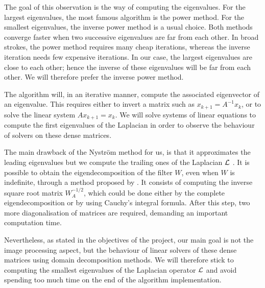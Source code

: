 The goal of this observation is the way of computing the eigenvalues.
For the largest eigenvalues, the most famous algorithm is the power method.
For the smallest eigenvalues, the inverse power method is a usual choice.
Both methods converge faster when two successive eigenvalues are far from each other.
In broad strokes, the power method requires many cheap iterations, whereas the inverse iteration needs few expensive iterations.
In our case, the largest eigenvalues are close to each other; hence the inverse of these eigenvalues will be far from each other.
We will therefore prefer the inverse power method.

The algorithm will, in an iterative manner, compute the associated eigenvector of an eigenvalue.
This requires either to invert a matrix such as \(x_{k+1} = A^{-1} x_k\), or to solve the linear system \(A x_{k+1} = x_k\).
We will solve systems of linear equations to compute the first eigenvalues of the Laplacian in order to observe the behaviour of solvers on these dense matrices.

The main drawback of the Nystr\"om method for us, is that it approximates the leading eigenvalues but we compute the trailing ones of the Laplacian \(\operatorname{\mathcal{L}}\) \cite{belongie_spectral_2002}.
It is possible to obtain the eigendecomposition of the filter \(W\), even when \(W\) is indefinite, through a method proposed by \cite{fowlkes_spectral_2004}.
It consists of computing the inverse square root matrix \(W_A^{-1/2}\), which could be done either by the complete eigendecomposition or by using Cauchy's integral formula.
After this step, two more diagonalisation of matrices are required, demanding an important computation time.

Nevertheless, as stated in the objectives of the project, our main goal is not the image processing aspect, but the behaviour of linear solvers of these dense matrices using domain decomposition methods.
We will therefore stick to computing the smallest eigenvalues of the Laplacian operator \(\operatorname{\mathcal{L}}\) and avoid spending too much time on the end of the algorithm implementation.
